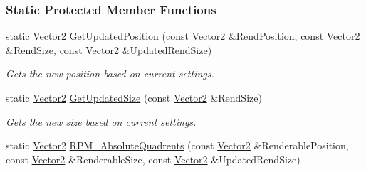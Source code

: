 \subsubsection*{Static Protected Member Functions}
\begin{DoxyCompactItemize}
\item 
\hypertarget{classMezzanine_1_1UI_1_1ViewportUpdateTool_af3748a145393f0b4a60d252a7ceff5fe}{
static \hyperlink{classMezzanine_1_1Vector2}{Vector2} \hyperlink{classMezzanine_1_1UI_1_1ViewportUpdateTool_af3748a145393f0b4a60d252a7ceff5fe}{GetUpdatedPosition} (const \hyperlink{classMezzanine_1_1Vector2}{Vector2} \&RendPosition, const \hyperlink{classMezzanine_1_1Vector2}{Vector2} \&RendSize, const \hyperlink{classMezzanine_1_1Vector2}{Vector2} \&UpdatedRendSize)}
\label{classMezzanine_1_1UI_1_1ViewportUpdateTool_af3748a145393f0b4a60d252a7ceff5fe}

\begin{DoxyCompactList}\small\item\em Gets the new position based on current settings. \item\end{DoxyCompactList}\item 
\hypertarget{classMezzanine_1_1UI_1_1ViewportUpdateTool_ae941b5b9c30fc197771a4b8bc41f4c38}{
static \hyperlink{classMezzanine_1_1Vector2}{Vector2} \hyperlink{classMezzanine_1_1UI_1_1ViewportUpdateTool_ae941b5b9c30fc197771a4b8bc41f4c38}{GetUpdatedSize} (const \hyperlink{classMezzanine_1_1Vector2}{Vector2} \&RendSize)}
\label{classMezzanine_1_1UI_1_1ViewportUpdateTool_ae941b5b9c30fc197771a4b8bc41f4c38}

\begin{DoxyCompactList}\small\item\em Gets the new size based on current settings. \item\end{DoxyCompactList}\item 
\hypertarget{classMezzanine_1_1UI_1_1ViewportUpdateTool_aa7a830fd2866e71653e987819e881f33}{
static \hyperlink{classMezzanine_1_1Vector2}{Vector2} \hyperlink{classMezzanine_1_1UI_1_1ViewportUpdateTool_aa7a830fd2866e71653e987819e881f33}{RPM\_\-AbsoluteQuadrents} (const \hyperlink{classMezzanine_1_1Vector2}{Vector2} \&RenderablePosition, const \hyperlink{classMezzanine_1_1Vector2}{Vector2} \&RenderableSize, const \hyperlink{classMezzanine_1_1Vector2}{Vector2} \&UpdatedRendSize)}
\label{classMezzanine_1_1UI_1_1ViewportUpdateTool_aa7a830fd2866e71653e987819e881f33}


\end{DoxyCompactItemize}

